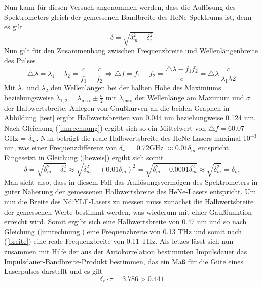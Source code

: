 Nun kann für diesen Versuch angenommen werden, dass die Auflösung des Spektrometers gleich der gemessenen Bandbreite des HeNe-Spektrums ist, denn es gilt
\begin{equation}
\delta=\sqrt{\delta_m^2-\delta_r^2}
\label{beweis}
\end{equation}
Nun gilt für den Zusammenhang zwischen Frequenzbreite und Wellenlängenbreite des Pulses
\begin{equation}
\triangle\lambda=\lambda_1-\lambda_2=\frac{c}{f_1}-\frac{c}{f_2}\Rightarrow \triangle f=f_1-f_2=\frac{\triangle\lambda-f_1f_2}{c}=\triangle\lambda\:\frac{c}{\lambda_1\lambda2}
\label{umrechnung}
\end{equation}
Mit $\lambda_1$ und $\lambda_2$ den Wellenlängen bei der halben Höhe des Maximiums beziehungsweise $\lambda_{1,2}=\lambda_{\text{max}}\pm\frac{\sigma}{2}$ mit $\lambda_{\text{max}}$ der Wellenlänge am Maximum und $\sigma$ der Halbwertsbreite. Anlegen von Gaußkurven an die beiden Graphen in Abbildung \ref{test} ergibt Halbwertsbreiten von 0.044 nm beziehungweise 0.124 nm. Nach Gleichung (\ref{umrechnung}) ergibt sich so ein Mittelwert von \newline
$\triangle f=$60.07 GHz = $\delta_m$. Nun beträgt die reale Halbwertsbreite des HeNe-Lasers maximal 10$^{-3}$nm, was einer Frequenzdifferenz von $\delta_r=$ 0.72GHz $\approx0.01\delta_m$ entspricht. Eingesetzt in Gleichung (\ref{beweis}) ergibt sich somit
\begin{equation*}
\delta=\sqrt{\delta_m^2-\delta_r^2}\approx\sqrt{\delta_m^2-(0.01\delta_m)^2}=\sqrt{\delta_m^2-0.0001\delta_m^2}\approx\sqrt{\delta_m^2}=\delta_m
\end{equation*}
Man sieht also, dass in diesem Fall das Auflösungsvermögen des Spektrometers in guter Näherung der gemessenen Halbwertsbreite des HeNe-Lasers entspricht. Um nun die Breite des Nd:YLF-Lasers zu messen muss zunächst die Halbwertsbreite der gemessenen Werte bestimmt werden, was wiederum mit einer Gaußfunktion erreicht wird. Somit ergibt sich eine Halbwertsbreite von 0.47 nm und so nach Gleichung (\ref{umrechnung}) eine Frequenzbreite von 0.13 THz und somit nach (\ref{breite}) eine reale Frequenzbreite von 0.11 THz.\newline
Als letzes lässt sich nun zusammen mit Hilfe der aus der Autokorrelation bestimmten Impulsdauer das Impulsdauer-Bandbreite-Produkt bestimmen, das ein Maß für die Güte eines Laserpulses darstellt und es gilt
\begin{equation}
\delta_r\cdot\tau=3.786> 0.441
\label{impulsbandbreite}
\end{equation}
